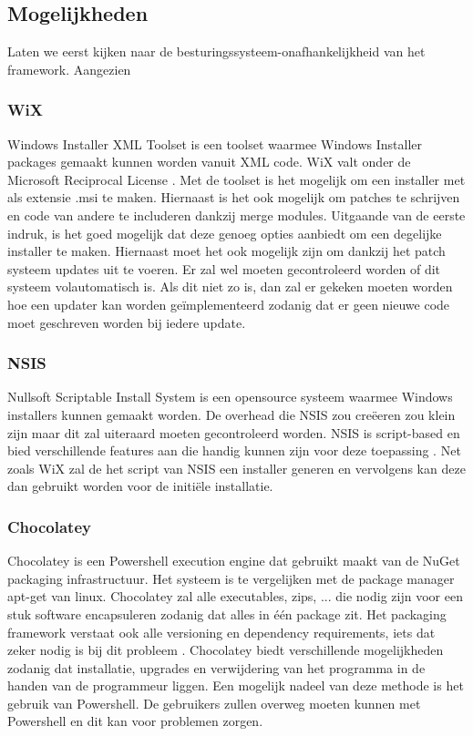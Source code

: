 \documentclass{article}
\begin{document}
\subsection{Mogelijkheden}\label{section:mogelijkheden}
Laten we eerst kijken naar de besturingssysteem-onafhankelijkheid van het framework.
Aangezien 
\subsubsection{WiX \citep{wixMain}}
Windows Installer XML Toolset is een toolset waarmee Windows Installer packages gemaakt kunnen worden vanuit XML code.
WiX valt onder de Microsoft Reciprocal License \citep{wixLicense}.
Met de toolset is het mogelijk om een installer met als extensie .msi te maken.
Hiernaast is het ook mogelijk om patches te schrijven en code van andere te includeren dankzij merge modules\citep{wixMergers}.
Uitgaande van de eerste indruk, is het goed mogelijk dat deze genoeg opties aanbiedt om een degelijke installer te maken.
Hiernaast moet het ook mogelijk zijn om dankzij het patch systeem updates uit te voeren.
Er zal wel moeten gecontroleerd worden of dit systeem volautomatisch is.
Als dit niet zo is, dan zal er gekeken moeten worden hoe een updater kan worden ge\"implementeerd zodanig dat er geen nieuwe code moet geschreven worden bij iedere update.

\subsubsection{NSIS \citep{nsisMain}}
Nullsoft Scriptable Install System is een opensource systeem waarmee Windows installers kunnen gemaakt worden.
De overhead die NSIS zou cre\"eeren zou klein zijn maar dit zal uiteraard moeten gecontroleerd worden. 
NSIS is script-based en bied verschillende features aan die handig kunnen zijn voor deze toepassing \citep{nsisFeatures}.
Net zoals WiX zal de het script van NSIS een installer generen en vervolgens kan deze dan gebruikt worden voor de initi\"ele installatie.

\subsubsection{Chocolatey \citep{chocoMain}}
Chocolatey is een Powershell execution engine dat gebruikt maakt van de NuGet packaging infrastructuur.
Het systeem is te vergelijken met de package manager apt-get van linux.
Chocolatey zal alle executables, zips, ... die nodig zijn voor een stuk software encapsuleren zodanig dat alles in \'e\'en package zit.
Het packaging framework verstaat ook alle versioning en dependency requirements, iets dat zeker nodig is bij dit probleem \citep{chocoDoc}.
Chocolatey biedt verschillende mogelijkheden zodanig dat installatie, upgrades en verwijdering van het programma in de handen van de programmeur liggen.
Een mogelijk nadeel van deze methode is het gebruik van Powershell. 
De gebruikers zullen overweg moeten kunnen met Powershell en dit kan voor problemen zorgen. 
\end{document}
